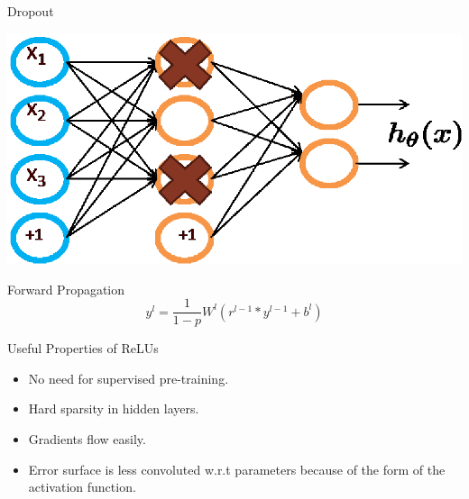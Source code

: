\documentclass{beamer}
\begin{document}
\begin{frame}{Dropout}
\begin{center}  
  \includegraphics[scale=0.5]{Figures/dropout.eps}
\end{center}
{ Forward Propagation}
$$y^{l} = \frac{1}{1-p}W^{l}(r^{l-1} * y^{l-1} + b^{l})$$
\end{frame}

\begin{frame}{Useful Properties of ReLUs}
\begin{itemize}
    \item No need for supervised pre-training.
    \item Hard sparsity in hidden layers.
    \item Gradients flow easily.
    \item Error surface is less convoluted w.r.t parameters because of the form of the activation function.
  \end{itemize}
\end{frame}
\end{document}
